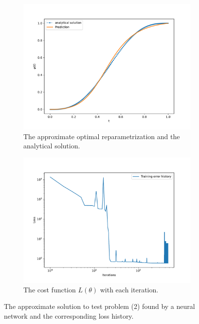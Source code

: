 \begin{figure}[t]\label{fig:curve_2_example}
    \begin{subfigure}[t]{0.5\textwidth}\label{fig:curve_2_solution}
        \centering
        \includegraphics[width=\linewidth]{figures/curve_2/exp_3/plot_0_0.pdf}
        \caption{The approximate optimal reparametrization and the analytical solution.}
    \end{subfigure}
    \begin{subfigure}[t]{0.5\textwidth}\label{fig:curve_2_history}
        \centering
        \includegraphics[width=\linewidth]{figures/curve_2/exp_3/history_plot_0.pdf}
        \caption{The cost function \(L(\theta)\) with each iteration.}
    \end{subfigure}
    \caption{The approximate solution to test problem (2) found by a neural network and the corresponding loss history.}
\end{figure}

